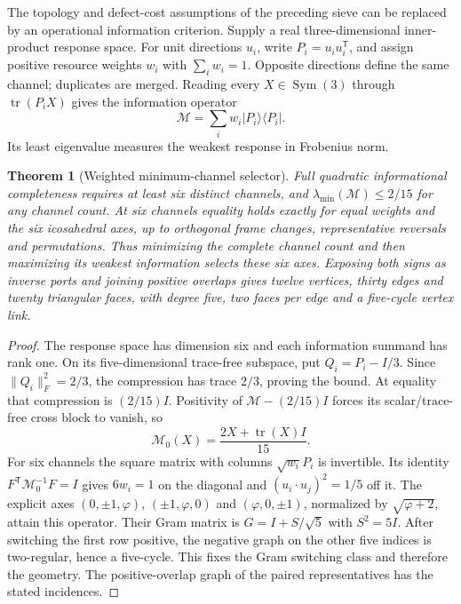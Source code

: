 \documentclass[11pt]{article}
\newtheorem{theorem}{Theorem}[section]
\theoremstyle{remark}
\theoremstyle{plain}
\begin{document}
The topology and defect-cost assumptions of the preceding sieve can be
replaced by an operational information criterion. Supply a real
three-dimensional inner-product response space. For unit directions $u_i$,
write $P_i=u_iu_i^{\mathsf T}$, and assign positive resource weights
$w_i$ with $\sum_iw_i=1$. Opposite directions define the same channel;
duplicates are merged. Reading every $X\in\operatorname{Sym}(3)$ through
$\operatorname{tr}(P_iX)$ gives the information operator
\[
 \mathcal M=\sum_iw_i|P_i\rangle\langle P_i|.
\]
Its least eigenvalue measures the weakest response in Frobenius norm.

\begin{theorem}[Weighted minimum-channel selector]
\label{thm:weighted-carrier-selector}
Full quadratic informational completeness requires at least six distinct
channels, and $\lambda_{\min}(\mathcal M)\le2/15$ for any channel count.
At six channels equality holds exactly for equal weights and the six
icosahedral axes, up to orthogonal frame changes, representative reversals
and permutations. Thus minimizing the complete channel count and then
maximizing its weakest information selects these six axes. Exposing both
signs as inverse ports and joining positive overlaps gives twelve vertices,
thirty edges and twenty triangular faces, with degree five, two faces per
edge and a five-cycle vertex link.
\end{theorem}
\begin{proof}
The response space has dimension six and each information summand has
rank one. On its five-dimensional trace-free subspace, put
$Q_i=P_i-I/3$. Since $\|Q_i\|_F^2=2/3$, the compression has trace $2/3$,
proving the bound. At equality that compression is $(2/15)I$.
Positivity of $\mathcal M-(2/15)I$ forces its scalar/trace-free cross
block to vanish, so
\[
 \mathcal M_0(X)=\frac{2X+\operatorname{tr}(X)I}{15}.
\]
For six channels the square matrix with columns $\sqrt{w_i}P_i$ is
invertible. Its identity $F^{\mathsf T}\mathcal M_0^{-1}F=I$ gives
$6w_i=1$ on the diagonal and $(u_i\cdot u_j)^2=1/5$ off it.
The explicit axes $(0,\pm1,\varphi)$, $(\pm1,\varphi,0)$ and
$(\varphi,0,\pm1)$, normalized by $\sqrt{\varphi+2}$, attain this
operator. Their Gram matrix is $G=I+S/\sqrt5$ with $S^2=5I$.
After switching the first row positive, the negative graph on the other
five indices is two-regular, hence a five-cycle. This fixes the Gram
switching class and therefore the geometry. The positive-overlap graph
of the paired representatives has the stated incidences.
\end{proof}
\end{document}
